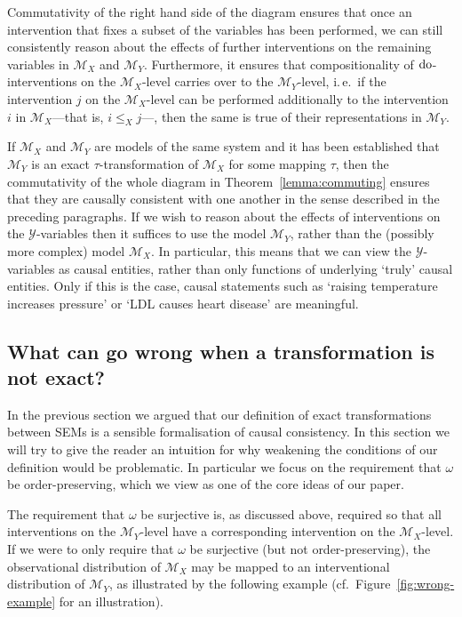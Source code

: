 Commutativity of the right hand side of the diagram ensures that once an intervention that fixes a subset of the variables has been performed, we can still consistently reason about the effects of further interventions on the remaining variables in $\mathcal{M}_X$ and $\mathcal{M}_Y$.
Furthermore, it ensures that compositionality of $\operatorname{do}$-interventions on the $\mathcal{M}_X$-level carries over to the $\mathcal{M}_Y$-level, i.\,e.\ if the intervention $j$ on the $\mathcal{M}_X$-level can be performed additionally to the intervention $i$ in $\mathcal{M}_X$---that is, $i\leq_X j$---, then the same is true of their representations in $\mathcal{M}_Y$.

If $\mathcal{M}_X$ and $\mathcal{M}_Y$ are models of the same system and it has been established that $\mathcal{M}_Y$ is an exact $\tau$-transformation of $\mathcal{M}_X$ for some mapping $\tau$, then the commutativity of the whole diagram in Theorem~\ref{lemma:commuting} ensures that they are causally consistent with one another in the sense described in the preceding paragraphs.
If we wish to reason about the effects of interventions on the $\mathcal{Y}$-variables then it suffices to use the model $\mathcal{M}_Y$, rather than the (possibly more complex) model $\mathcal{M}_X$.
In particular, this means that we can view the $\mathcal{Y}$-variables as causal entities, rather than only functions of underlying `truly' causal entities.
Only if this is the case, causal statements such as `raising temperature increases pressure' or `LDL causes heart disease' are meaningful.

\subsection{What can go wrong when a transformation is not exact?}\label{sec:wrong}

In the previous section we argued that our definition of exact transformations between SEMs is a sensible formalisation of causal consistency.
In this section we will try to give the reader an intuition for why weakening the conditions of our definition would be problematic.
In particular we focus on the requirement that $\omega$ be order-preserving, which we view as one of the core ideas of our paper.

The requirement that $\omega$ be surjective is, as discussed above, required so that all interventions on the $\mathcal{M}_Y$-level have a corresponding intervention on the $\mathcal{M}_X$-level.
If we were to only require that $\omega$ be surjective (but not order-preserving), the observational distribution of $\mathcal{M}_X$ may be mapped to an interventional distribution of $\mathcal{M}_Y$, as illustrated by the following example (cf.\ Figure~\ref{fig:wrong-example} for an illustration).

